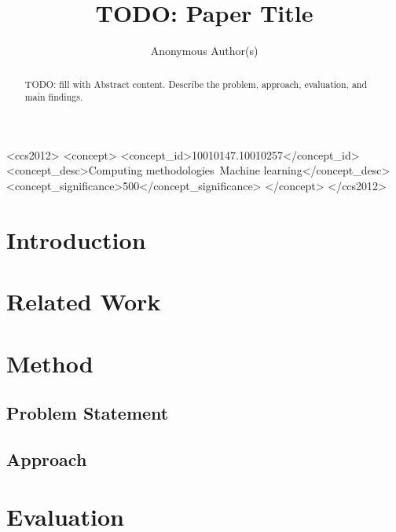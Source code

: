 \documentclass[sigconf,review,anonymous]{acmart}
\title{TODO: Paper Title}
\author{Anonymous Author(s)}
\affiliation{\institution{Anonymous Institution}}
\begin{document}
\begin{abstract}
TODO: fill with Abstract content. Describe the problem, approach, evaluation, and main findings.
\end{abstract}

\begin{CCSXML}
<ccs2012>
  <concept>
    <concept_id>10010147.10010257</concept_id>
    <concept_desc>Computing methodologies~Machine learning</concept_desc>
    <concept_significance>500</concept_significance>
  </concept>
</ccs2012>
\end{CCSXML}



\maketitle

\section{Introduction}

\section{Related Work}

\section{Method}

\subsection{Problem Statement}

\subsection{Approach}

\section{Evaluation}
\end{document}
